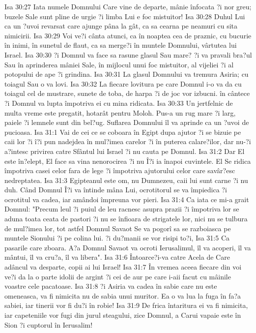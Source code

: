 Isa 30:27  Iata numele Domnului Care vine de departe, mânie înfocata ?i nor greu; buzele Sale sunt pline de urgie ?i limba Lui e foc mistuitor!
Isa 30:28  Duhul Lui ca un ?uvoi revarsat care ajunge pâna la gât, ca sa cearna pe neamuri cu sita nimicirii.
Isa 30:29  Voi ve?i cânta atunci, ca în noaptea cea de praznic, cu bucurie în inimi, în sunetul de flaut, ca sa merge?i în muntele Domnului, vârtutea lui Israel.
Isa 30:30  ?i Domnul va face sa rasune glasul Sau mare? ?i va pravali bra?ul Sau în aprinderea mâniei Sale, în mijlocul unui foc mistuitor, al vijeliei ?i al potopului de ape ?i grindina.
Isa 30:31  La glasul Domnului va tremura Asiria; cu toiagul Sau o va lovi.
Isa 30:32  La fiecare lovitura pe care Domnul i-o va da cu toiagul cel de mustrare, sunete de toba, de harpa ?i de joc vor izbucni. în cântece ?i Domnul va lupta împotriva ei cu mina ridicata.
Isa 30:33  Un jertfelnic de multa vreme este pregatit, hotarât pentru Moloh. Pus-a un rug mare ?i larg, paiele ?i lemnele sunt din bel?ug. Suflarea Domnului îl va aprinde ca un ?uvoi de pucioasa.
Isa 31:1  Vai de cei ce se coboara în Egipt dupa ajutor ?i se bizuie pe caii lor ?i î?i pun nadejdea în mul?imea carelor ?i în puterea calare?ilor, dar nu-?i a?intesc privirea catre Sfântul lui Israel ?i nu cauta pe Domnul.
Isa 31:2  Dar El este în?elept, El face sa vina nenorocirea ?i nu Î?i ia înapoi cuvintele. El Se ridica împotriva casei celor fara de lege ?i împotriva ajutorului celor care savâr?esc nedreptatea.
Isa 31:3  Egipteanul este om, nu Dumnezeu, caii lui sunt carne ?i nu duh. Când Domnul Î?i va întinde mâna Lui, ocrotitorul se va împiedica ?i ocrotitul va cadea, iar amândoi împreuna vor pieri.
Isa 31:4  Ca iata ce mi-a grait Domnul: "Precum leul ?i puiul de leu racnesc asupra prazii ?i împotriva lor se aduna toata ceata de pastori ?i nu se înfioara de strigatele lor, nici nu se tulbura de mul?imea lor, tot astfel Domnul Savaot Se va pogorî sa se razboiasca pe muntele Sionului ?i pe colina lui. ?i du?manii se vor risipi to?i,
Isa 31:5  Ca pasarile care zboara. A?a Domnul Savaot va ocroti Ierusalimul, îl va acoperi, îl va mântui, îl va cru?a, îl va libera".
Isa 31:6  Întoarce?i-va catre Acela de Care adâncul va desparte, copii ai lui Israel!
Isa 31:7  În vremea aceea fiecare din voi ve?i da la o parte idolii de argint ?i cei de aur pe care i-aii facut cu mâinile voastre cele pacatoase.
Isa 31:8  ?i Asiria va cadea în sabie care nu este omeneasca, va fi nimicita nu de sabia unui muritor. Ea o va lua la fuga în fa?a sabiei, iar tinerii vor fi du?i în robie!
Isa 31:9  De frica întaritura ei va fi nimicita, iar capeteniile vor fugi din jurul steagului, zice Domnul, a Carui vapaie este în Sion ?i cuptorul în Ierusalim!
